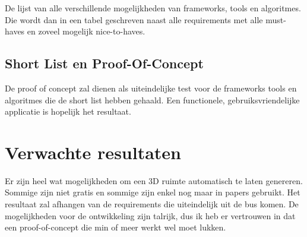 \documentclass{hogent-article}
\begin{document}
De lijst van alle verschillende mogelijkheden van frameworks, tools en algoritmes. Die wordt dan in een tabel geschreven naast alle requirements met alle must-haves en zoveel mogelijk nice-to-haves.

\subsection{Short List en Proof-Of-Concept}

De proof of concept zal dienen als uiteindelijke test voor de frameworks tools en algoritmes die de short list hebben gehaald. Een functionele, gebruiksvriendelijke applicatie is hopelijk het resultaat.

\section{Verwachte resultaten}%
\label{sec:verwachte-resultaten}


Er zijn heel wat mogelijkheden om een 3D ruimte automatisch te laten genereren. Sommige zijn niet gratis en sommige zijn enkel nog maar in papers gebruikt. Het resultaat zal afhangen van de requirements die uiteindelijk uit de bus komen. De mogelijkheden voor de ontwikkeling zijn talrijk, dus ik heb er vertrouwen in dat een proof-of-concept die min of meer werkt wel moet lukken.  







\printbibliography[heading=bibintoc]
\end{document}
